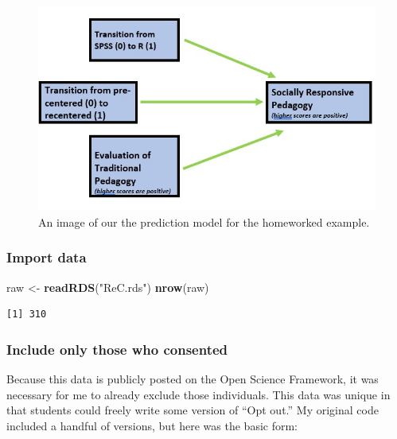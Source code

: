 \documentclass[
  11pt,
]{book}
\newenvironment{Shaded}{\begin{snugshade}}{\end{snugshade}}
\newcommand{\FunctionTok}[1]{\textcolor[rgb]{0.27,0.27,0.27}{\textbf{#1}}}
\newcommand{\NormalTok}[1]{#1}
\newcommand{\OtherTok}[1]{\textcolor[rgb]{0.37,0.37,0.37}{#1}}
\newcommand{\StringTok}[1]{\textcolor[rgb]{0.5,0.5,0.5}{#1}}
\begin{document}
\begin{figure}
\centering
\includegraphics{Worked_Examples/images/homeworked_model.jpg}
\caption{An image of our the prediction model for the homeworked example.}
\end{figure}

\hypertarget{import-data}{%
\subsubsection*{Import data}\label{import-data}}


\begin{Shaded}
\begin{Highlighting}[]
\NormalTok{raw }\OtherTok{\textless{}{-}} \FunctionTok{readRDS}\NormalTok{(}\StringTok{"ReC.rds"}\NormalTok{)}
\FunctionTok{nrow}\NormalTok{(raw)}
\end{Highlighting}
\end{Shaded}

\begin{verbatim}
[1] 310
\end{verbatim}

\hypertarget{include-only-those-who-consented}{%
\subsubsection*{Include only those who consented}\label{include-only-those-who-consented}}


Because this data is publicly posted on the Open Science Framework, it was necessary for me to already exclude those individuals. This data was unique in that students could freely write some version of ``Opt out.'' My original code included a handful of versions, but here was the basic form:
\end{document}
